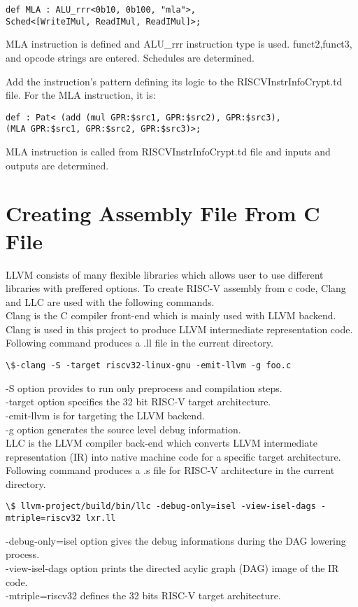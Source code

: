 \begin{lstlisting}
def MLA : ALU_rrr<0b10, 0b100, "mla">,
Sched<[WriteIMul, ReadIMul, ReadIMul]>;
\end{lstlisting}

MLA instruction is defined and ALU\_rrr instruction type is used. funct2,funct3, and opcode strings are entered. Schedules are determined.

Add the instruction’s pattern defining its logic to the RISCVInstrInfoCrypt.td file. For the MLA instruction, it is:

\begin{lstlisting}
def : Pat< (add (mul GPR:$src1, GPR:$src2), GPR:$src3),
(MLA GPR:$src1, GPR:$src2, GPR:$src3)>;
\end{lstlisting}

MLA instruction is called from RISCVInstrInfoCrypt.td file and inputs and outputs are determined.



\section{Creating Assembly File From C File}

LLVM consists of many flexible libraries which allows user to use different libraries with preffered  options. To create RISC-V assembly from c code, Clang and LLC are used with the following commands. \\

Clang is the C compiler front-end which is mainly used with LLVM backend. Clang is used in this project to produce LLVM intermediate representation code. Following command produces a .ll file in the current directory. 

\begin{lstlisting}
\$-clang -S -target riscv32-linux-gnu -emit-llvm -g foo.c
\end{lstlisting}

-S option provides to run only preprocess and compilation steps. \\
-target option specifies the 32 bit RISC-V target architecture. \\
-emit-llvm is for targeting the LLVM backend. \\
-g option generates the source level debug information.\\

LLC is the LLVM compiler back-end which converts LLVM intermediate representation (IR) into native machine code for a specific target architecture. Following command produces a .s file for RISC-V architecture in the current directory. 

\begin{lstlisting}
\$ llvm-project/build/bin/llc -debug-only=isel -view-isel-dags -mtriple=riscv32 lxr.ll
\end{lstlisting}

-debug-only=isel option gives the debug informations during the DAG lowering process.\\
-view-isel-dags option prints the directed acylic graph (DAG) image of the IR code.\\
-mtriple=riscv32 defines the 32 bits RISC-V target architecture.\\